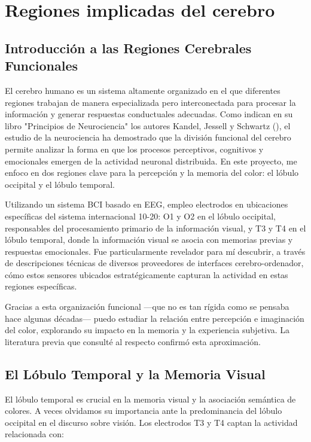 \chapter{Regiones implicadas del cerebro}\label{ch:brain_regions}

\section{Introducción a las Regiones Cerebrales Funcionales}

El cerebro humano es un sistema altamente organizado en el que diferentes regiones trabajan de manera especializada pero interconectada para procesar la información y generar respuestas conductuales adecuadas. Como indican en su libro "Principios de Neurociencia" los autores Kandel, Jessell y Schwartz (\citeyear{Kandel_Jessell_Schwartz_2001}), el estudio de la neurociencia ha demostrado que la división funcional del cerebro permite analizar la forma en que los procesos perceptivos, cognitivos y emocionales emergen de la actividad neuronal distribuida. En este proyecto, me enfoco en dos regiones clave para la percepción y la memoria del color: el lóbulo occipital y el lóbulo temporal. 

Utilizando un sistema BCI basado en EEG, empleo electrodos en ubicaciones específicas del sistema internacional 10-20: O1 y O2 en el lóbulo occipital, responsables del procesamiento primario de la información visual, y T3 y T4 en el lóbulo temporal, donde la información visual se asocia con memorias previas y respuestas emocionales. Fue particularmente revelador para mí descubrir, a través de descripciones técnicas de diversos proveedores de interfaces cerebro-ordenador, cómo estos sensores ubicados estratégicamente capturan la actividad en estas regiones específicas.

Gracias a esta organización funcional —que no es tan rígida como se pensaba hace algunas décadas— puedo estudiar la relación entre percepción e imaginación del color, explorando su impacto en la memoria y la experiencia subjetiva. La literatura previa que consulté al respecto confirmó esta aproximación.

\newpage

\section{El Lóbulo Temporal y la Memoria Visual}

El lóbulo temporal es crucial en la memoria visual y la asociación semántica de colores. A veces olvidamos su importancia ante la predominancia del lóbulo occipital en el discurso sobre visión. Los electrodos T3 y T4 captan la actividad relacionada con:

